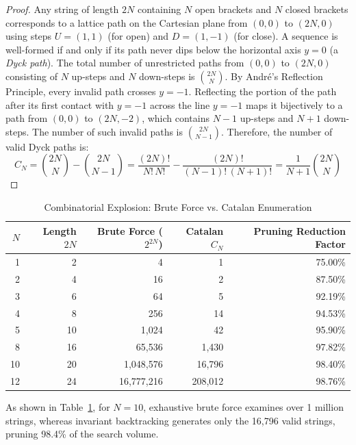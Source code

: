 \documentclass[10pt,journal,compsoc,onecolumn]{IEEEtran}
\begin{document}
\begin{proof}
Any string of length $2N$ containing $N$ open brackets and $N$ closed brackets corresponds to a lattice path on the Cartesian plane from $(0, 0)$ to $(2N, 0)$ using steps $U = (1, 1)$ (for open) and $D = (1, -1)$ (for close). A sequence is well-formed if and only if its path never dips below the horizontal axis $y = 0$ (a \textit{Dyck path}).
The total number of unrestricted paths from $(0, 0)$ to $(2N, 0)$ consisting of $N$ up-steps and $N$ down-steps is $\binom{2N}{N}$.
By André's Reflection Principle, every invalid path crosses $y = -1$. Reflecting the portion of the path after its first contact with $y = -1$ across the line $y = -1$ maps it bijectively to a path from $(0, 0)$ to $(2N, -2)$, which contains $N-1$ up-steps and $N+1$ down-steps. The number of such invalid paths is $\binom{2N}{N-1}$.
Therefore, the number of valid Dyck paths is:
\begin{equation}
C_N = \binom{2N}{N} - \binom{2N}{N-1} = \frac{(2N)!}{N!\,N!} - \frac{(2N)!}{(N-1)!\,(N+1)!} = \frac{1}{N+1}\binom{2N}{N}
\end{equation}
\end{proof}

\begin{table}[htbp]
\centering
\caption{Combinatorial Explosion: Brute Force vs. Catalan Enumeration}
\label{tab:catalan_growth}
\begin{tabular}{rrrrr}
\toprule
$N$ & Length $2N$ & Brute Force ($2^{2N}$) & Catalan $C_N$ & Pruning Reduction Factor \\
\midrule
1 & 2 & 4 & 1 & 75.00\% \\
2 & 4 & 16 & 2 & 87.50\% \\
3 & 6 & 64 & 5 & 92.19\% \\
4 & 8 & 256 & 14 & 94.53\% \\
5 & 10 & 1,024 & 42 & 95.90\% \\
8 & 16 & 65,536 & 1,430 & 97.82\% \\
10 & 20 & 1,048,576 & 16,796 & 98.40\% \\
12 & 24 & 16,777,216 & 208,012 & 98.76\% \\
\bottomrule
\end{tabular}
\end{table}

As shown in Table~\ref{tab:catalan_growth}, for $N=10$, exhaustive brute force examines over 1 million strings, whereas invariant backtracking generates only the 16,796 valid strings, pruning 98.4\% of the search volume.
\end{document}
